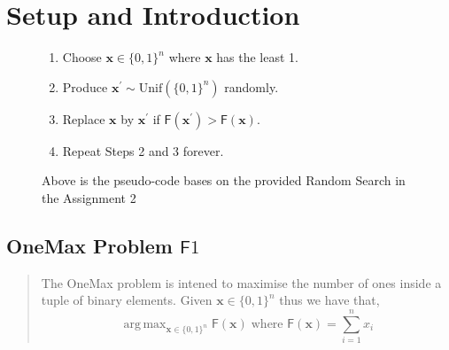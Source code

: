 \documentclass[a4paper, 12pt]{article}
\DeclareMathOperator*{\argmax}{arg\,max}
\begin{document}
\section*{Setup and Introduction}
\begin{figure}[H]
    \begin{tcolorbox}[title={Maximisation Random Search (from Assignment 2)}, colback=black!10, colframe=black!70, fonttitle=\bfseries]
        \begin{enumerate}
            \item Choose $\mathbf{x}\in\{0,1\}^n$ where $\mathbf{x}$ has the least 1.
            \item Produce $\mathbf{x}^\prime\sim\text{Unif}(\{0,1\}^n)$ randomly.
            \item Replace $\mathbf{x}$ by $\mathbf{x}^\prime$ if $\mathsf{F}(\mathbf{x}^\prime) > \mathsf{F}(\mathbf{x})$.
            \item Repeat Steps 2 and 3 forever.
        \end{enumerate}
    \end{tcolorbox}
        \caption{Above is the pseudo-code bases on the provided Random Search in the Assignment 2}
\end{figure}
\subsection*{OneMax Problem $\mathsf{F}1$}
    \begin{quote}
        The OneMax problem is intened to maximise the number of ones inside a tuple of binary elements. Given $\mathbf{x}\in\{0,1\}^n$ thus we have that,
        \begin{equation*}
            \argmax_{\mathbf{x}\in\{0,1\}^n}\mathsf{F}(\mathbf{x})\;\text{where } \mathsf{F}(\mathbf{x}) = \sum_{i = 1}^{n}x_i
        \end{equation*}
    \end{quote}
\end{document}
